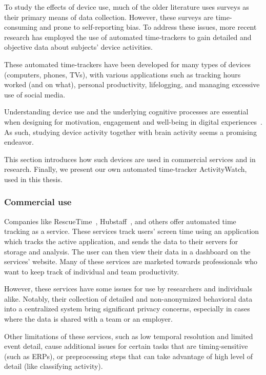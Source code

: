     To study the effects of device use, much of the older literature uses surveys as their primary means of data collection. However, these surveys are time-consuming and prone to self-reporting bias. To address these issues, more recent research has employed the use of automated time-trackers to gain detailed and objective data about subjects' device activities.

    These automated time-trackers have been developed for many types of devices (computers, phones, TVs), with various applications such as tracking hours worked (and on what), personal productivity, lifelogging, and managing excessive use of social media.

    Understanding device use and the underlying cognitive processes are essential when designing for motivation, engagement and well-being in digital experiences~\cite{peters_designing_2018}. As such, studying device activity together with brain activity seems a promising endeavor.

    This section introduces how such devices are used in commercial services and in research. Finally, we present our own automated time-tracker ActivityWatch, used in this thesis.

    \subsubsection*{Commercial use}

        Companies like RescueTime~\cite{noauthor_rescuetime_nodate}, Hubstaff~\cite{noauthor_hubstaff_nodate}, and others offer automated time tracking as a service. These services track users' screen time using an application which tracks the active application, and sends the data to their servers for storage and analysis. The user can then view their data in a dashboard on the services' website. Many of these services are marketed towards professionals who want to keep track of individual and team productivity.

        However, these services have some issues for use by researchers and individuals alike. Notably, their collection of detailed and non-anonymized behavioral data into a centralized system bring significant privacy concerns, especially in cases where the data is shared with a team or an employer.

        Other limitations of these services, such as low temporal resolution and limited event detail, cause additional issues for certain tasks that are timing-sensitive (such as ERPs), or preprocessing steps that can take advantage of high level of detail (like classifying activity).

